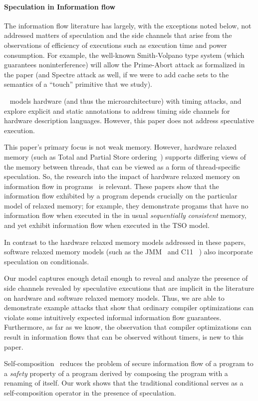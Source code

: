 \paragraph*{Speculation in Information flow}

The information flow literature has largely, with the exceptions noted below, not addressed matters of speculation and the side channels that arise from the observations  of efficiency of executions such as execution time and  power consumption.  For example, the well-known Smith-Volpano type system (which guarantees noninterference) will allow the Prime-Abort attack as formalized
in the paper (and Spectre attack as well, if we were to add cache sets to the semantics of a ``touch'' primitive that we study). 

~\citet{Zhang:2012:LCM:2345156.2254078}  models hardware (and thus the
microarchitecture) with timing attacks, and explore explicit and static annotations to address timing side channels for hardware description languages.  However, this paper does not address speculative execution. 

This paper's primary focus is not weak memory.  However, hardware relaxed memory (such as Total and Partial Store ordering~\cite{SparcV9}) supports differing views of the memory between threads, that can be viewed as a form of thread-specific speculation.  So, the research into the impact of hardware relaxed memory on information flow in programs~\cite{6957104,Vaughan:2012:SIF} is relevant.  These papers show that the information flow exhibited by a program  depends crucially on the particular model of relaxed memory; for example, they demonstrate progams that have no information flow when executed in the in usual {\em sequentially consistent} memory, and yet exhibit information flow when executed in the TSO model. 

In contrast to the hardware relaxed memory models addressed in these papers, software relaxed memory models (such as the JMM~\cite{Manson:2005:JMM:1047659.1040336} and C11~\cite{Boehm:2008:FCC:1375581.1375591} ) also incorporate speculation on conditionals.   

Our model captures enough detail  enough to reveal and analyze the presence of side
channels revealed by speculative executions that are implicit in the literature on hardware and software relaxed memory models. Thus, we are able to demonstrate example attacks that show that ordinary compiler optimizations can
violate some intuitively expected informal information flow guarantees.  Furthermore,  as far as we know, the observation that compiler optimizations can result in information flows that can be observed without timers, is new to this paper.  

Self-composition~\cite{Barthe:2004:SIF:1009380.1009669} reduces the problem of secure information flow of a program to a {\em safety} property of a program derived by composing the program with a renaming of itself.  Our work shows that the traditional conditional serves as a self-composition operator in the presence of speculation.  


